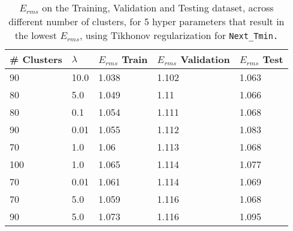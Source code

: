 \def\arraystretch{1.25}
\begin{table}[H]
\centering
\begin{tabular}{l l l l l}
\hline
\hline
\textbf{\# Clusters} & \textbf{$\lambda$} & \textbf{$E_{rms}$ Train} & \textbf{$E_{rms}$ Validation} & \textbf{$E_{rms}$ Test}\\
\hline
\hline
90 & 10.0 & 1.038 & 1.102 & 1.063\\
80 & 5.0 & 1.049 & 1.11 & 1.066\\
80 & 0.1 & 1.054 & 1.111 & 1.068\\
90 & 0.01 & 1.055 & 1.112 & 1.083\\
70 & 1.0 & 1.06 & 1.113 & 1.068\\
100 & 1.0 & 1.065 & 1.114 & 1.077\\
70 & 0.01 & 1.061 & 1.114 & 1.069\\
70 & 5.0 & 1.059 & 1.116 & 1.068\\
90 & 5.0 & 1.073 & 1.116 & 1.095\\
\hline
\end{tabular}
\caption{$E_{rms}$ on the Training, Validation and Testing dataset, across different number of clusters, for 5 hyper parameters that result in the lowest $E_{rms}$, using Tikhonov regularization for \tt{Next\_Tmin}.}
\end{table}